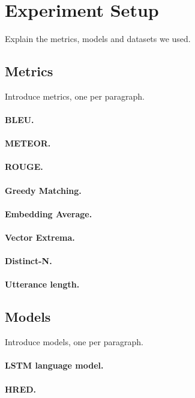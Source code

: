 \documentclass[runningheads]{llncs}
\begin{document}
    \section{Experiment Setup}
    Explain the metrics, models and datasets we used.

    \subsection{Metrics}
    Introduce metrics, one per paragraph.
    \paragraph{BLEU.}
    \paragraph{METEOR.}
    \paragraph{ROUGE.}

    \paragraph{Greedy Matching.}
    \paragraph{Embedding Average.}
    \paragraph{Vector Extrema.}

    \paragraph{Distinct-N.}
    \paragraph{Utterance length.}

    \subsection{Models}
    Introduce models, one per paragraph.
    \paragraph{LSTM language model.}
    \paragraph{HRED.}
\end{document}
